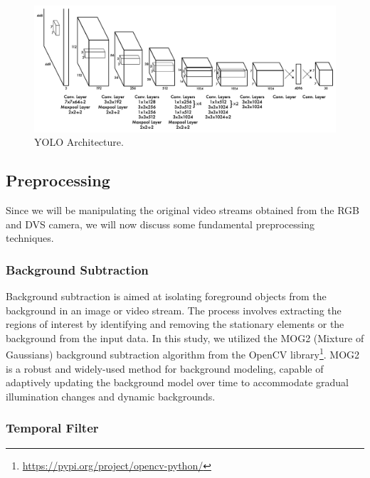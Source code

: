 \documentclass[sigchi,screen]{acmart}
\begin{document}
\begin{figure}[ht] %
    \centering %
    \includegraphics[width=\linewidth]{figures/architecture.png} %
    \caption{YOLO Architecture.} %
    \label{fig:architecture} %
\end{figure}

\subsection{Preprocessing}

Since we will be manipulating the original video streams obtained from the RGB and DVS camera, we will now discuss some fundamental preprocessing techniques.

\subsubsection{Background Subtraction}
Background subtraction is aimed at isolating foreground objects from the background in an image or video stream. The process involves extracting the regions of interest by identifying and removing the stationary elements or the background from the input data. In this study, we utilized the MOG2 (Mixture of Gaussians) background subtraction algorithm from the OpenCV library\footnote{\url{https://pypi.org/project/opencv-python/}}. MOG2 is a robust and widely-used method for background modeling, capable of adaptively updating the background model over time to accommodate gradual illumination changes and dynamic backgrounds.

\subsubsection{Temporal Filter}
\end{document}
